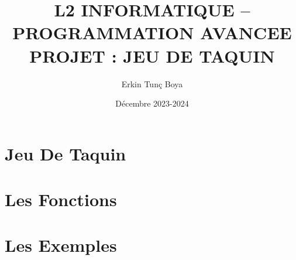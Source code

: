 \documentclass{article}
\title{L2 INFORMATIQUE – PROGRAMMATION AVANCEE \\ PROJET : JEU DE TAQUIN}
\author{Erkin Tunç Boya}
\date{Décembre 2023-2024}
\begin{document}
\maketitle
\tableofcontents
\newpage


\section{Jeu De Taquin}


\section{Les Fonctions}


\section{Les Exemples}
\end{document}
